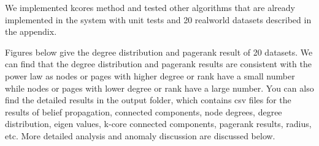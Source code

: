 
We implemented kcores method
and tested other algorithms that are already implemented in the system with unit tests and 20 realworld datasets described in the appendix.

Figures below give the degree distribution and pagerank result of 20 datasets. We can find that the degree distribution and pagerank results are consistent with the power law as nodes or pages with higher degree or rank have a small number while nodes or pages with lower degree or rank have a large number.
You can also find the detailed results in the output folder, which contains csv files for the results of belief propagation, connected components, node degrees, degree distribution, eigen values, k-core connected components, pagerank results, radius, etc. More detailed analysis and anomaly discussion are discussed below.


